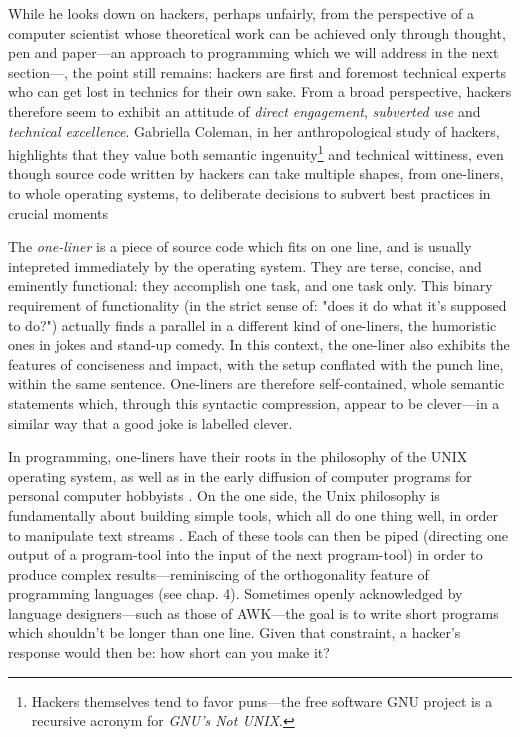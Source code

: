 While he looks down on hackers, perhaps unfairly, from the perspective of a computer scientist whose theoretical work can be achieved only through thought, pen and paper—an approach to programming which we will address in the next section—, the point still remains: hackers are first and foremost technical experts who can get lost in technics for their own sake. From a broad perspective, hackers therefore seem to exhibit an attitude of \emph{direct engagement}, \emph{subverted use} and \emph{technical excellence}.  Gabriella Coleman, in her anthropological study of hackers, highlights that they value both semantic ingenuity\footnote{Hackers themselves tend to favor puns—the free software GNU project is a recursive acronym for \emph{GNU's Not UNIX}.} and technical wittiness, even though source code written by hackers can take multiple shapes, from one-liners, to whole operating systems, to deliberate decisions to subvert best practices in crucial moments

The \emph{one-liner} is a piece of source code which fits on one line, and is usually intepreted immediately by the operating system. They are terse, concise, and eminently functional: they accomplish one task, and one task only. This binary requirement of functionality (in the strict sense of: "does it do what it's supposed to do?") actually finds a parallel in a different kind of one-liners, the humoristic ones in jokes and stand-up comedy. In this context, the one-liner also exhibits the features of conciseness and impact, with the setup conflated with the punch line, within the same sentence. One-liners are therefore self-contained, whole semantic statements which, through this syntactic compression, appear to be clever—in a similar way that a good joke is labelled clever.

In programming, one-liners have their roots in the philosophy of the UNIX operating system, as well as in the early diffusion of computer programs for personal computer hobbyists \citep{montfort_10_2014}. On the one side, the Unix philosophy is fundamentally about building simple tools, which all do one thing well, in order to manipulate text streams \citep{raymond_art_2003}. Each of these tools can then be piped (directing one output of a program-tool into the input of the next program-tool) in order to produce complex results—reminiscing of the orthogonality feature of programming languages (see chap. 4). Sometimes openly acknowledged by language designers—such as those of AWK—the goal is to write short programs which shouldn't be longer than one line. Given that constraint, a hacker's response would then be: how short can you make it?

